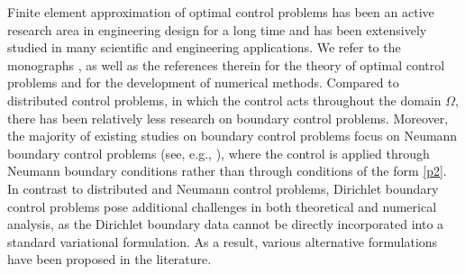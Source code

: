 \documentclass[a4paper,10pt]{article}
\numberwithin{theorem}{section}
\begin{document}
Finite element approximation of optimal control problems has been an active research area in engineering design for a long time and has been extensively studied in many scientific and engineering applications. We refer to the monographs   \cite{MHinze_RPinnau_MUlbrich_SUlbrich_2009a,FTroeltzsch_2010a,BVexler_DMeidner_2025}, as well as the references therein for the theory  of  optimal control problems and for the development of numerical methods. Compared to distributed control problems, in which the control acts throughout the domain $\Omega$, there has been relatively less research on boundary control problems. Moreover,  the majority of existing studies on  boundary control problems focus on Neumann boundary control problems (see, e.g., \cite{NArada_ECasas_FTroeltzsch_2002a,ECasas_MMateos_2008a,TGeveci_1979,MHinze_UMatthes_2009a}), where the control is applied through Neumann boundary conditions rather than through conditions of the form \eqref{p2}. In contrast to distributed and Neumann control problems, Dirichlet boundary control problems pose additional challenges in both theoretical and numerical analysis, as the Dirichlet boundary data cannot be directly incorporated into a standard variational formulation. As a result, various alternative formulations have been proposed in the literature.
\end{document}
